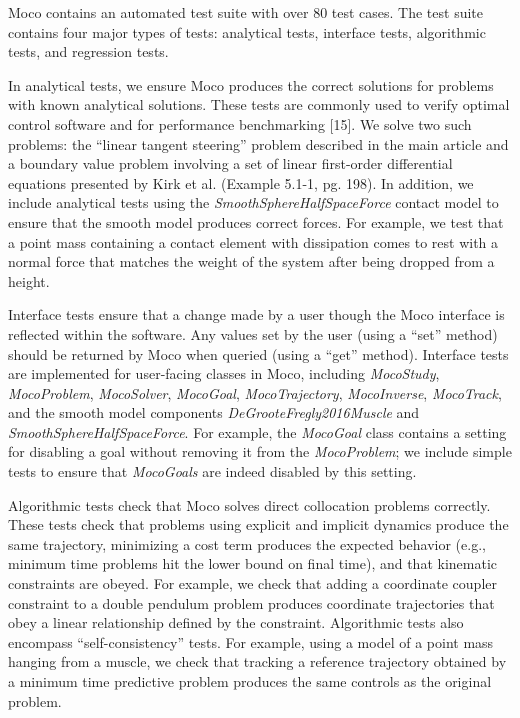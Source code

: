 \documentclass[10pt,letterpaper]{article}
\begin{document}
Moco contains an automated test suite with over 80 test cases. The test suite contains four major types of tests: analytical tests, interface tests, algorithmic tests, and regression tests.

In analytical tests, we ensure Moco produces the correct solutions for problems with known analytical solutions. These tests are commonly used to verify optimal control software and for performance benchmarking [15]. We solve two such problems: the “linear tangent steering” problem described in the main article and a boundary value problem involving a set of linear first-order differential equations presented by Kirk et al. \cite{Kirk:2004} (Example 5.1-1, pg. 198). In addition, we include analytical tests using the \textit{SmoothSphereHalfSpaceForce} contact model to ensure that the smooth model produces correct forces. For example, we test that a point mass containing a contact element with dissipation comes to rest with a normal force that matches the weight of the system after being dropped from a height.

Interface tests ensure that a change made by a user though the Moco interface is reflected within the software. Any values set by the user (using a “set” method) should be returned by Moco when queried (using a “get” method). Interface tests are implemented for user-facing classes in Moco, including \textit{MocoStudy}, \textit{MocoProblem}, \textit{MocoSolver}, \textit{MocoGoal}, \textit{MocoTrajectory}, \textit{MocoInverse}, \textit{MocoTrack}, and the smooth model components \textit{DeGrooteFregly2016Muscle} and \textit{SmoothSphereHalfSpaceForce}. For example, the \textit{MocoGoal} class contains a setting for disabling a goal without removing it from the \textit{MocoProblem}; we include simple tests to ensure that \textit{MocoGoals} are indeed disabled by this setting.

Algorithmic tests check that Moco solves direct collocation problems correctly. These tests check that problems using explicit and implicit dynamics produce the same trajectory, minimizing a cost term produces the expected behavior (e.g., minimum time problems hit the lower bound on final time), and that kinematic constraints are obeyed. For example, we check that adding a coordinate coupler constraint to a double pendulum problem produces coordinate trajectories that obey a linear relationship defined by the constraint. Algorithmic tests also encompass “self-consistency” tests. For example, using a model of a point mass hanging from a muscle, we check that tracking a reference trajectory obtained by a minimum time predictive problem produces the same controls as the original problem.
\end{document}
